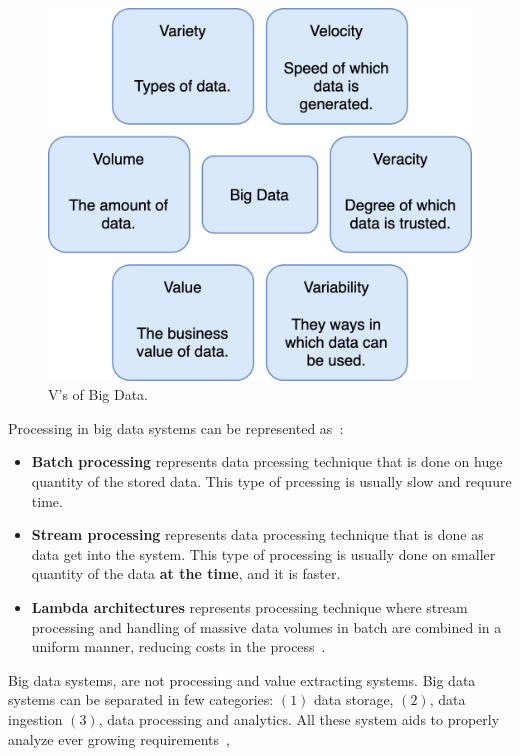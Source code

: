 \begin{figure}[H]
	\begin{center}
		\includegraphics[scale=0.7]{images/Figure3.png}
	\end{center}
	\vspace{-0.6cm}
	\caption{V's of Big Data.}
	\label{fig:fig3}
\end{figure}

Processing in big data systems can be represented as~\cite{phdthesis, KiranMMDB15}:

\begin{itemize}
	\item \textbf{Batch processing} represents data prcessing technique that is done on huge quantity of the stored data. This type of prcessing is usually slow and requure time.
	\item \textbf{Stream processing} represents data processing technique that is done as data get into the system. This type of processing is usually done on smaller quantity of the data \textbf{at the time}, and it is faster.
	\item \textbf{Lambda architectures} represents processing technique where stream processing and handling of massive data volumes in batch are combined in a uniform manner, reducing costs in the process~\cite{KiranMMDB15}.
\end{itemize}

Big data systems, are not processing and value extracting systems. Big data systems can be separated in few categories: $(1)$ data storage, $(2)$, data ingestion $(3)$, data processing and analytics. All these system aids to properly analyze ever growing requirements~\cite{RaoMBG19},

